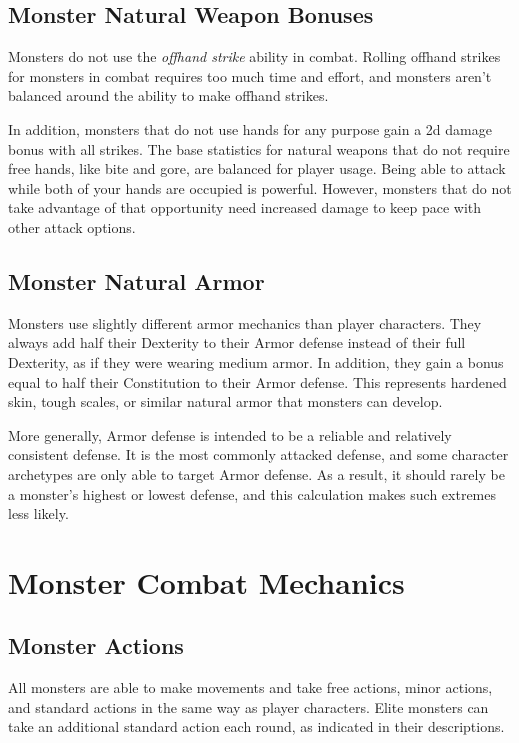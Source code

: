     \subsection{Monster Natural Weapon Bonuses}\label{Monster Natural Weapon Bonuses}
        Monsters do not use the \textit{offhand strike} ability in combat.
        Rolling offhand strikes for monsters in combat requires too much time and effort, and monsters aren't balanced around the ability to make offhand strikes.

        In addition, monsters that do not use hands for any purpose gain a \plus2d damage bonus with all strikes.
        The base statistics for natural weapons that do not require free hands, like bite and gore, are balanced for player usage.
        Being able to attack while both of your hands are occupied is powerful.
        However, monsters that do not take advantage of that opportunity need increased damage to keep pace with other attack options.

    \subsection{Monster Natural Armor}\label{Monster Natural Armor}
        Monsters use slightly different armor mechanics than player characters.
        They always add half their Dexterity to their Armor defense instead of their full Dexterity, as if they were wearing medium armor.
        In addition, they gain a bonus equal to half their Constitution to their Armor defense.
        This represents hardened skin, tough scales, or similar natural armor that monsters can develop.

        More generally, Armor defense is intended to be a reliable and relatively consistent defense.
        It is the most commonly attacked defense, and some character archetypes are only able to target Armor defense.
        As a result, it should rarely be a monster's highest or lowest defense, and this calculation makes such extremes less likely.

\section{Monster Combat Mechanics}

    \subsection{Monster Actions}\label{Monster Actions}
        All monsters are able to make movements and take free actions, minor actions, and standard actions in the same way as player characters.
        Elite monsters can take an additional standard action each round, as indicated in their descriptions.

